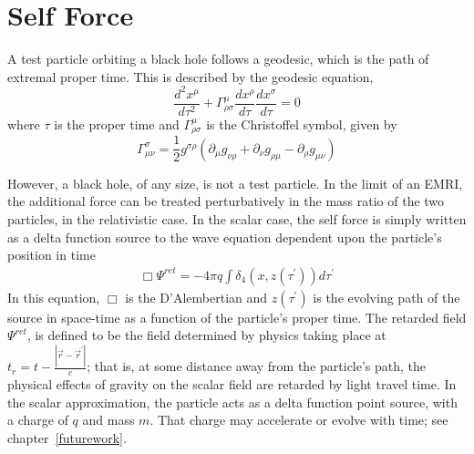 

\section{Self Force}

A test particle orbiting a black hole follows a geodesic, which is the path of extremal proper time. This is described by the geodesic equation,
\begin{equation}
\frac{d^2x^\mu}{d\tau^2}+\Gamma^\mu_{\rho\sigma}\frac{dx^\rho}{d\tau}\frac{dx^\sigma}{d\tau}=0
\end{equation}
where $\tau$ is the proper time and $\Gamma^\mu_{\rho\sigma}$ is the Christoffel symbol, given by~\cite{Carroll}
\begin{equation}
\Gamma^\sigma_{\mu\nu}=\frac{1}{2}g^{\sigma\rho}(\partial_\mu g_{\nu\rho}+\partial_\nu g_{\rho\mu} - \partial_\rho g_{\mu\nu})
\end{equation}

However, a black hole, of any size, is not a test particle. In the limit of an EMRI, the additional force can be treated perturbatively in the mass ratio of the two particles, in the relativistic case. In the scalar case, the self force is simply written as a delta function source to the wave equation dependent upon the particle's position in time~\cite{WardellSelfForceReview}
\begin{eqnarray}
  \Box\Psi^{ret}=-4\pi q\int\delta_4(x,z(\tau^\prime))d\tau^\prime
\end{eqnarray}
In this equation, $\Box$ is the D'Alembertian and $z(\tau^\prime)$ is the evolving path of the source in space-time as a function of the particle's proper time. The retarded field $\Psi^{ret}$, is defined to be the field determined by physics taking place at $t_r=t-\frac{|\vec{r}-\vec{r}^\prime|}{c}$; that is, at some distance away from the particle's path, the physical effects of gravity on the scalar field are retarded by light travel time. In the scalar approximation, the particle acts as a delta function point source, with a charge of $q$ and mass $m$. That charge may accelerate or evolve with time; see chapter~\ref{futurework}. 

